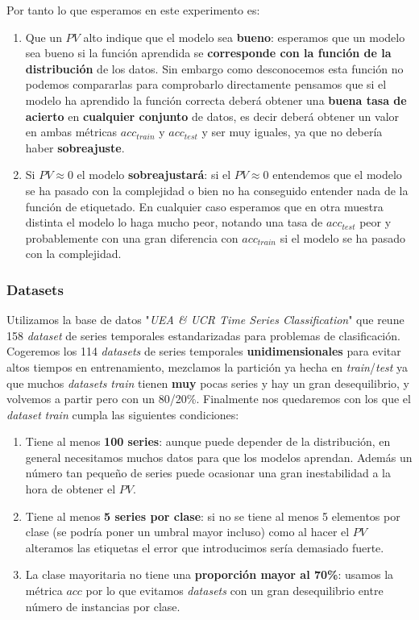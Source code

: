Por tanto lo que esperamos en este experimento es:

\begin{enumerate}
  \item Que un $PV$ alto indique que el modelo sea \textbf{bueno}: esperamos que un modelo sea bueno si la función aprendida se \textbf{corresponde con la función de la distribución} de los datos. Sin embargo como desconocemos esta función no podemos compararlas para comprobarlo directamente pensamos que si el modelo ha aprendido la función correcta deberá obtener una \textbf{buena tasa de acierto} en \textbf{cualquier conjunto} de datos, es decir deberá obtener un valor en ambas métricas $acc_{train}$ y $acc_{test}$ y ser muy iguales, ya que no debería haber \textbf{sobreajuste}.

  \item Si $PV \approx 0$ el modelo \textbf{sobreajustará}: si el $PV \approx 0$ entendemos que el modelo se ha pasado con la complejidad o bien no ha conseguido entender nada de la función de etiquetado. En cualquier caso esperamos que en otra muestra distinta el modelo lo haga mucho peor, notando una tasa de $acc_{test}$ peor y probablemente con una gran diferencia con $acc_{train}$ si el modelo se ha pasado con la complejidad.
\end{enumerate}

\subsubsection{Datasets}

Utilizamos la base de datos "\emph{UEA \& UCR Time Series Classification}" \cite{bagnall2020ts} que reune 158 \emph{dataset} de series temporales estandarizadas para problemas de clasificación. Cogeremos los 114 \emph{datasets} de series temporales \textbf{unidimensionales} para evitar altos tiempos en entrenamiento, mezclamos la partición ya hecha en \emph{train}/\emph{test} ya que muchos \emph{datasets} \emph{train} tienen \textbf{muy} pocas series y hay un gran desequilibrio, y volvemos a partir pero con un 80/20\%. Finalmente nos quedaremos con los que el \emph{dataset} \emph{train} cumpla las siguientes condiciones:

\begin{enumerate}
  \item Tiene al menos \textbf{100 series}: aunque puede depender de la distribución, en general necesitamos muchos datos para que los modelos aprendan. Además un número tan pequeño de series puede ocasionar una gran inestabilidad a la hora de obtener el $PV$.
  \item Tiene al menos \textbf{5 series por clase}: si no se tiene al menos 5 elementos por clase (se podría poner un umbral mayor incluso) como al hacer el $PV$ alteramos las etiquetas el error que introducimos sería demasiado fuerte.
  \item La clase mayoritaria no tiene una \textbf{proporción mayor al 70\%}: usamos la métrica $acc$ por lo que evitamos \emph{datasets} con un gran desequilibrio entre número de instancias por clase.
\end{enumerate}

